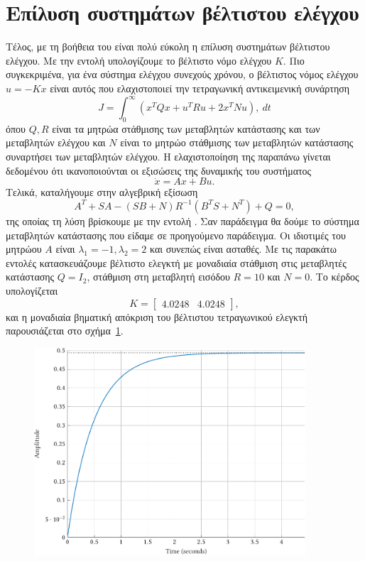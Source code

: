 \section{Επίλυση συστημάτων βέλτιστου ελέγχου}
Τέλος, με τη βοήθεια του  είναι πολύ εύκολη η επίλυση συστημάτων
βέλτιστου ελέγχου. Με την εντολή
υπολογίζουμε το βέλτιστο νόμο ελέγχου \( K \). Πιο συγκεκριμένα, για ένα σύστημα
ελέγχου συνεχούς χρόνου, ο βέλτιστος νόμος ελέγχου \( u = -Kx \) είναι αυτός που
ελαχιστοποιεί την τετραγωνική αντικειμενική συνάρτηση
\[
    J = \int_0^{\infty} \left( x^TQx + u^TRu + 2x^TNu \right) ,\ dt
\]
όπου \( Q, R \) είναι τα μητρώα στάθμισης των μεταβλητών κατάστασης και των
μεταβλητών ελέγχου και \( N \) είναι το μητρώο στάθμισης των μεταβλητών
κατάστασης συναρτήσει των μεταβλητών ελέγχου. Η ελαχιστοποίηση της παραπάνω
γίνεται δεδομένου ότι ικανοποιούνται οι εξισώσεις της δυναμικής του συστήματος
\[
    \dot{x} = Ax + Bu.
\]
Τελικά, καταλήγουμε στην αλγεβρική εξίσωση 
\[
    A^T + SA - (SB + N)R^{-1}(B^TS + N^T) + Q = 0,
\]
της οποίας τη λύση βρίσκουμε με την εντολή . Σαν παράδειγμα θα δούμε
το σύστημα μεταβλητών κατάστασης που είδαμε σε προηγούμενο παράδειγμα. Οι
ιδιοτιμές του μητρώου \( A \) είναι \( \lambda_1 = -1, \lambda_2 = 2 \)
και συνεπώς είναι ασταθές. Με τις παρακάτω εντολές κατασκευάζουμε βέλτιστο
ελεγκτή με μοναδιαία στάθμιση στις μεταβλητές κατάστασης \( Q = I_2 \),
στάθμιση στη μεταβλητή εισόδου \( R = 10 \) και \( N = 0 \).
\eng{}
Το κέρδος υπολογίζεται
\[
    K = \begin{bmatrix}4.0248 & 4.0248\end{bmatrix},
\]
και η μοναδιαία βηματική απόκριση του βέλτιστου τετραγωνικού ελεγκτή
παρουσιάζεται στο σχήμα~\ref{fig:prelim8}.
\begin{figure}[h]
    \centering
    \includegraphics[width=0.9\textwidth]{figures/prelim8.pdf}
    \label{fig:prelim8}
\end{figure}
